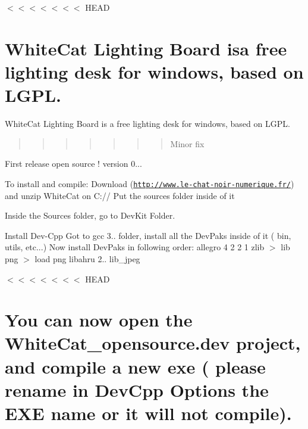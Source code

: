 $<$$<$$<$$<$$<$$<$$<$ H\-E\-A\-D \section*{White\-Cat Lighting Board isa free lighting desk for windows, based on L\-G\-P\-L. }

White\-Cat Lighting Board is a free lighting desk for windows, based on L\-G\-P\-L. \begin{quotation}
\begin{quotation}
\begin{quotation}
\begin{quotation}
\begin{quotation}
\begin{quotation}
\begin{quotation}
Minor fix

\end{quotation}


\end{quotation}


\end{quotation}


\end{quotation}


\end{quotation}


\end{quotation}


\end{quotation}


First release open source ! version 0...

To install and compile\-: Download (\href{http://www.le-chat-noir-numerique.fr/}{\tt http\-://www.\-le-\/chat-\/noir-\/numerique.\-fr/}) and unzip White\-Cat on C\-:// Put the sources folder inside of it

Inside the Sources folder, go to Dev\-Kit Folder.

Install Dev-\/\-Cpp Got to gcc 3.. folder, install all the Dev\-Paks inside of it ( bin, utils, etc...) Now install Dev\-Paks in following order\-: allegro 4 2 2 1 zlib $>$ lib png $>$ load png libahru 2.. lib\-\_\-jpeg

$<$$<$$<$$<$$<$$<$$<$ H\-E\-A\-D \section*{You can now open the White\-Cat\-\_\-opensource.\-dev project, and compile a new exe ( please rename in Dev\-Cpp Options the E\-X\-E name or it will not compile). }

